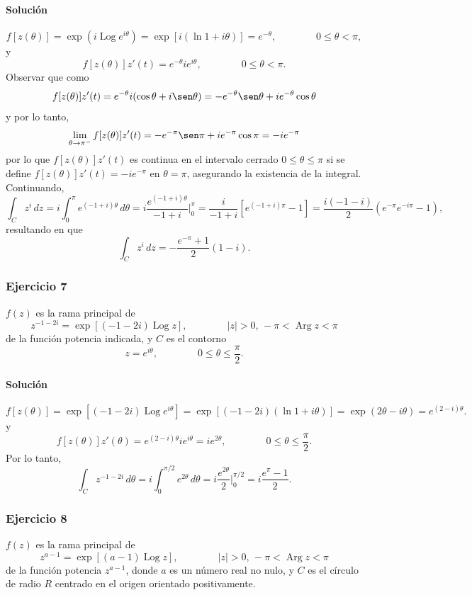 \documentclass[a4paper]{report}
\DeclareMathOperator{\Arg}{Arg}
\DeclareMathOperator{\Log}{Log}
\begin{document}
\paragraph{Solución} 
\[
 f[z(\theta)]=\exp\left(i\Log e^{i\theta}\right)=\exp\left[i(\ln1+i\theta)\right]=e^{-\theta},
 \qquad\qquad
 0\leq\theta<\pi,
\]
y
\[
 f[z(\theta)]z'(t)=e^{-\theta}ie^{i\theta},
 \qquad\qquad
 0\leq\theta<\pi.
\]
Observar que como
\[
 f[z(\theta)]z'(t)=e^{-\theta}i(\cos\theta+i\sen\theta)=-e^{-\theta}\sen\theta+ie^{-\theta}\cos\theta
\]
y por lo tanto,
\[
 \lim_{\theta\to\pi^-}f[z(\theta)]z'(t)=-e^{-\pi}\sen\pi+ie^{-\pi}\cos\pi=-ie^{-\pi}
\]
por lo que \(f[z(\theta)]z'(t)\) es continua en el intervalo cerrado \(0\leq\theta\leq\pi\) si se define \(f[z(\theta)]z'(t)=-ie^{-\pi}\) en \(\theta=\pi\), asegurando la existencia de la integral. Continuando,
\[
 \int_Cz^i\,dz=i\int_0^\pi e^{(-1+i)\theta}\,d\theta=i\frac{e^{(-1+i)\theta}}{-1+i}\bigg|_0^\pi
  =\frac{i}{-1+i}\left[e^{(-1+i)\pi}-1\right]=\frac{i(-1-i)}{2}\left(e^{-\pi}e^{-i\pi}-1\right),
\]
resultando en que 
\[
 \int_Cz^i\,dz=-\frac{e^{-\pi}+1}{2}(1-i).
\]

\subsubsection{Ejercicio 7}

\(f(z)\) es la rama principal de
\[
 z^{-1-2i}=\exp\left[(-1-2i)\Log z\right],
 \qquad\qquad
 |z|>0,\,-\pi<\Arg z<\pi
\]
de la función potencia indicada, y \(C\) es el contorno
\[
 z=e^{i\theta},
 \qquad\qquad
 0\leq\theta\leq\frac{\pi}{2}.
\]

\paragraph{Solución} 
\[
 f[z(\theta)]=\exp\left[(-1-2i)\Log e^{i\theta}\right]=\exp\left[(-1-2i)(\ln1+i\theta)\right]=\exp(2\theta-i\theta)=e^{(2-i)\theta}.
\]
y
\[
 f[z(\theta)]z'(\theta)=e^{(2-i)\theta}ie^{i\theta}=ie^{2\theta},
 \qquad\qquad
 0\leq\theta\leq\frac{\pi}{2}.
\]
Por lo tanto,
\[
 \int_Cz^{-1-2i}\,d\theta=i\int_0^{\pi/2}e^{2\theta}\,d\theta=i\frac{e^{2\theta}}{2}\bigg|_0^{\pi/2}=i\frac{e^\pi-1}{2}.
\]

\subsubsection{Ejercicio 8}

\(f(z)\) es la rama principal de
\[
 z^{a-1}=\exp\left[(a-1)\Log z\right],
 \qquad\qquad
 |z|>0,\,-\pi<\Arg z<\pi
\]
de la función potencia \(z^{a-1}\), donde \(a\) es un número real no nulo, y \(C\) es el círculo de radio \(R\) centrado en el origen orientado positivamente.
\end{document}
